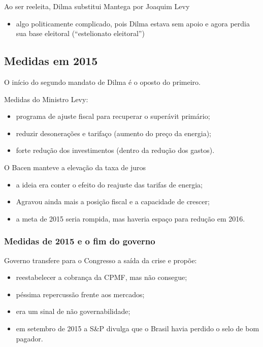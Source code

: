 \documentclass[a4paper,12pt]{article}[abntex2]
\begin{document}
Ao ser reeleita, Dilma substitui Mantega por Joaquim Levy

\begin{itemize}
    \item algo politicamente complicado, pois Dilma estava sem apoio e agora perdia sua base eleitoral (“estelionato eleitoral”)
\end{itemize}

\subsection{\textbf{Medidas em 2015}}
O início do segundo mandato de Dilma é o oposto do primeiro.

Medidas do Ministro Levy:

\begin{itemize}
    \item programa de ajuste fiscal para recuperar o superávit primário;
    \item reduzir desonerações e tarifaço (aumento do preço da energia);
    \item forte redução dos investimentos (dentro da redução dos gastos).
\end{itemize}

O Bacen manteve a elevação da taxa de juros

\begin{itemize}
    \item a ideia era conter o efeito do reajuste das tarifas de energia;
    \item Agravou ainda mais a posição fiscal e a capacidade de crescer;
    \item a meta de 2015 seria rompida, mas haveria espaço para redução em 2016.
\end{itemize}

\subsubsection{\textbf{Medidas de 2015 e o fim do governo}}
Governo transfere para o Congresso a saída da crise e propõe:

\begin{itemize}
    \item reestabelecer a cobrança da CPMF, mas não consegue;
    \item péssima repercussão frente aos mercados;
    \item era um sinal de não governabilidade;
    \item em setembro de 2015 a S\&P divulga que o Brasil havia perdido o selo de bom pagador.
\end{itemize}
\end{document}
